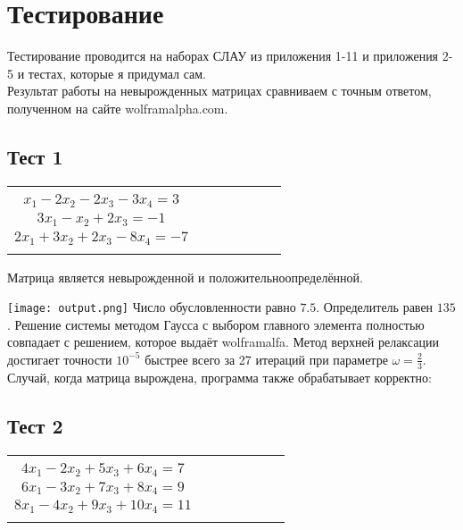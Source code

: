 \documentclass[a4paper,12pt,titlepage,finall]{article}
\begin{document}
\section{Тестирование}

Тестирование проводится на наборах СЛАУ из приложения 1-11 и приложения 2-5 и тестах, которые я придумал сам. \\
Результат работы на невырожденных матрицах сравниваем с точным ответом, полученном на сайте wolframalpha.com.\\

\subsection{Тест 1}

\begin{tabular}{ccccccc}
\begin{cases}
$ 4x_1 - 3x_2 + x_3 - 5x_4 = 7$\\
$ x_1 - 2x_2 - 2x_3 - 3x_4 = 3$\\
$ 3x_1 - x_2 + 2x_3 = -1 $\\
$ 2x_1 + 3x_2 + 2x_3 - 8x_4 = -7 $\\
\end{cases}
\end{tabular}

Матрица является невырожденной и положительноопределённой.

\texttt{[image: output.png]}
Число обусловленности равно $7.5$. Определитель равен $135$. Решение системы методом Гаусса с выбором главного элемента полностью совпадает с решением, которое выдаёт wolframalfa. Метод верхней релаксации достигает точности $10^{-5}$ быстрее всего за 27 итераций при параметре $\omega = \frac{2}{3}$.
\newpage
Случай, когда матрица вырождена, программа также обрабатывает корректно:
\subsection{Тест 2}
\begin{tabular}{ccccccc}
\begin{cases}
$ 2x_1 - x_2 + 3x_3 +4x_4 = 5 $\\
$ 4x_1 - 2x_2 + 5x_3 + 6x_4 = 7 $\\
$ 6x_1 - 3x_2 + 7x_3 + 8x_4 = 9 $\\
$ 8x_1 - 4x_2 + 9x_3 + 10x_4 = 11 $\\
\end{cases}
\end{tabular}
\end{document}
